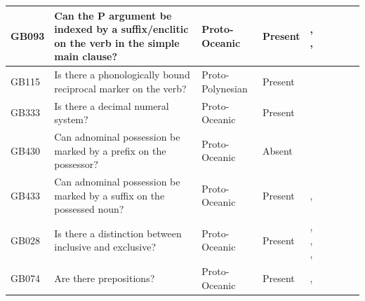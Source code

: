 \documentclass[a4paper,10pt]{article} %
\begin{document}
\begin{landscape}
\begin{longtable}{| p{2cm}| p{3cm}| p{2.5cm}|p{2cm}|p{2cm}|p{2cm}|p{2cm}|p{2cm}|p{2cm}|}
GB093&Can the P argument be indexed by a suffix/enclitic on the verb in the simple main clause?&Proto-Oceanic&Present&\citet[498-499]{ross2004morphosyntactic}, \citet[83]{lynchrosscrowley_proto_grammar_oceanic}, \citet[112]{evans2003study}& \cellcolor{hedvig_lightgreen!50}{True Positive} & \cellcolor{hedvig_yellow!50}{Half} & \cellcolor{hedvig_lightgreen!50}{True Positive} & \cellcolor{hedvig_lightgreen!50}{True Positive} \\ \hline
GB115&Is there a phonologically bound reciprocal marker on the verb?&Proto-Polynesian&Present&\citet[4]{marck2000_encyclo}& \cellcolor{hedvig_lightgreen!50}{True Positive} & \cellcolor{hedvig_yellow!50}{Half} & \cellcolor{hedvig_lightgreen!50}{True Positive} & \cellcolor{hedvig_lightgreen!50}{True Positive} \\ \hline
GB333&Is there a decimal numeral system?&Proto-Oceanic&Present&\citet[72]{lynchrosscrowley_proto_grammar_oceanic}& \cellcolor{hedvig_lightgreen!50}{True Positive} & \cellcolor{hedvig_yellow!50}{Half} & \cellcolor{hedvig_lightgreen!50}{True Positive} & \cellcolor{hedvig_lightgreen!50}{True Positive} \\ \hline
GB430&Can adnominal possession be marked by a prefix on the possessor?&Proto-Oceanic&Absent&\citet[511]{ross2004morphosyntactic}& \cellcolor{hedvig_lightgreen!50}{True Negative} & \cellcolor{hedvig_yellow!50}{Half} & \cellcolor{hedvig_yellow!50}{True Negative} & \cellcolor{hedvig_yellow!50}{True Negative} \\ \hline
GB433&Can adnominal possession be marked by a suffix on the possessed noun?&Proto-Oceanic&Present&\citet[495]{ross2004morphosyntactic}, \citet[155]{pawley1973some}& \cellcolor{hedvig_lightgreen!50}{True Positive} & \cellcolor{hedvig_yellow!50}{Half} & \cellcolor{hedvig_lightgreen!50}{True Positive} & \cellcolor{hedvig_lightgreen!50}{True Positive} \\ \hline
GB028&Is there a distinction between inclusive and exclusive?&Proto-Oceanic&Present&\citet[112]{pawley1973some}, \citet[184]{crowley1985common}, \citet[500]{ross2004morphosyntactic}, \citet[67, 75]{lynchrosscrowley_proto_grammar_oceanic}& \cellcolor{hedvig_lightgreen!50}{True Positive} & \cellcolor{hedvig_yellow!50}{Half} & \cellcolor{hedvig_lightgreen!50}{True Positive} & \cellcolor{hedvig_lightgreen!50}{True Positive} \\ \hline
GB074&Are there prepositions?&Proto-Oceanic&Present&\citet[167]{pawley1973some}, \citet[498]{ross2004morphosyntactic}& \cellcolor{hedvig_lightgreen!50}{True Positive} & \cellcolor{hedvig_yellow!50}{Half} & \cellcolor{hedvig_lightgreen!50}{True Positive} & \cellcolor{hedvig_lightgreen!50}{True Positive} \\ \hline

\end{longtable}
\end{landscape}
\end{document}
